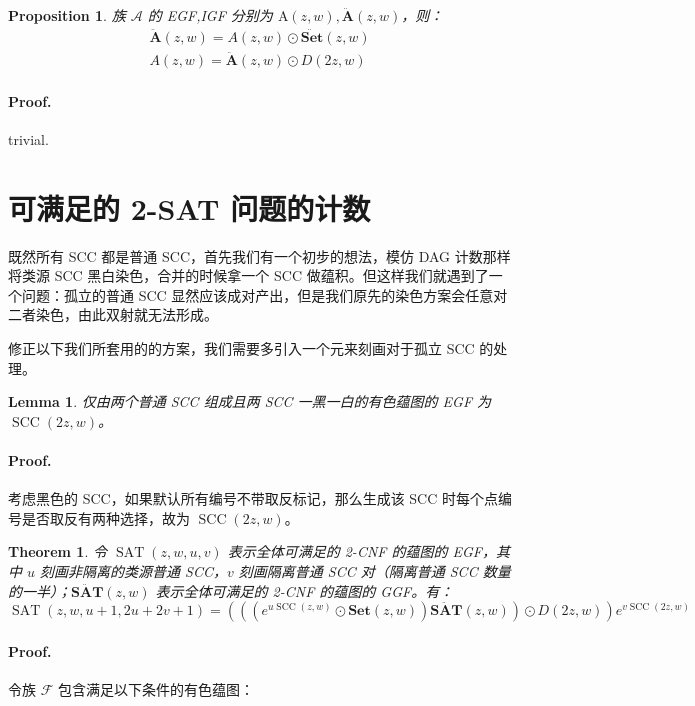 \documentclass[10pt,a4paper,oneside]{article}
\newtheorem{theorem}[definition]{Theorem}
\newtheorem{lemma}[definition]{Lemma}
\newtheorem{proposition}[definition]{Proposition}
\begin{document}
\begin{proposition}
    族 $\mathcal{A}$ 的 EGF,IGF 分别为 $\mathrm A(z,w), \ddot{\mathbf{A}}(z,w)$，则：
    \[\begin{aligned}
\ddot{\mathbf{A}}(z,w) = A(z,w) \odot \ddot{\mathbf{Set}}(z,w)\\
A(z,w) = \ddot{\mathbf{A}}(z,w) \odot D(2z,w)
\end{aligned}\]
\end{proposition}

\paragraph{Proof.} trivial.

\section{可满足的 2-SAT 问题的计数}

既然所有 SCC 都是普通 SCC，首先我们有一个初步的想法，模仿 DAG 计数那样将类源 SCC 黑白染色，合并的时候拿一个 SCC 做蕴积。但这样我们就遇到了一个问题：孤立的普通 SCC 显然应该成对产出，但是我们原先的染色方案会任意对二者染色，由此双射就无法形成。

修正以下我们所套用的的方案，我们需要多引入一个元来刻画对于孤立 SCC 的处理。

\begin{lemma}
    仅由两个普通 SCC 组成且两 SCC 一黑一白的有色蕴图的 EGF 为 $\operatorname{SCC}(2z,w)$。
\end{lemma}

\paragraph{Proof.} 考虑黑色的 SCC，如果默认所有编号不带取反标记，那么生成该 SCC 时每个点编号是否取反有两种选择，故为 $\operatorname{SCC}(2z,w)$。

\begin{theorem}
    令 $\operatorname{SAT}(z,w,u,v)$ 表示全体可满足的 2-CNF 的蕴图的 EGF，其中 $u$ 刻画非隔离的类源普通 SCC，$v$ 刻画隔离普通 SCC 对（隔离普通 SCC 数量的一半）；$\ddot{\mathbf{SAT}}(z,w)$ 表示全体可满足的 2-CNF 的蕴图的 GGF。有：
    \[\operatorname{SAT}(z,w,u+1,2u+2v+1) = \left(\left(\left(e^{u\operatorname{SCC}(z,w)}\odot \mathbf{Set}(z,w)\right) \ddot{\mathbf{SAT}}(z,w)\right)\odot D(2z,w)\right)e^{v\operatorname{SCC}(2z,w)}\]
\end{theorem}

\paragraph{Proof.} 令族 $\mathcal F$ 包含满足以下条件的有色蕴图：
\end{document}
